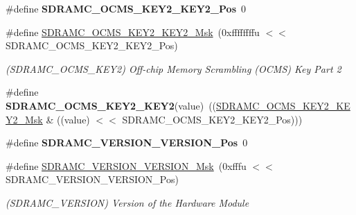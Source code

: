 \begin{DoxyCompactItemize}
\item 
\mbox{\label{group__SAMV71__SDRAMC_ga7a2a31e2cacb71d4e7ef8788168221b0}} 
\#define {\bfseries S\+D\+R\+A\+M\+C\+\_\+\+O\+C\+M\+S\+\_\+\+K\+E\+Y2\+\_\+\+K\+E\+Y2\+\_\+\+Pos}~0
\item 
\mbox{\label{group__SAMV71__SDRAMC_gadf72e098f3b0fbc622694203aae6fa80}} 
\#define \mbox{\hyperlink{group__SAMV71__SDRAMC_gadf72e098f3b0fbc622694203aae6fa80}{S\+D\+R\+A\+M\+C\+\_\+\+O\+C\+M\+S\+\_\+\+K\+E\+Y2\+\_\+\+K\+E\+Y2\+\_\+\+Msk}}~(0xffffffffu $<$$<$ S\+D\+R\+A\+M\+C\+\_\+\+O\+C\+M\+S\+\_\+\+K\+E\+Y2\+\_\+\+K\+E\+Y2\+\_\+\+Pos)
\begin{DoxyCompactList}\small\item\em (S\+D\+R\+A\+M\+C\+\_\+\+O\+C\+M\+S\+\_\+\+K\+E\+Y2) Off-\/chip Memory Scrambling (O\+C\+MS) Key Part 2 \end{DoxyCompactList}\item 
\mbox{\label{group__SAMV71__SDRAMC_gaca7b60dd7970cf6a278623e5d9f74205}} 
\#define {\bfseries S\+D\+R\+A\+M\+C\+\_\+\+O\+C\+M\+S\+\_\+\+K\+E\+Y2\+\_\+\+K\+E\+Y2}(value)~((\mbox{\hyperlink{group__SAMV71__SDRAMC_gadf72e098f3b0fbc622694203aae6fa80}{S\+D\+R\+A\+M\+C\+\_\+\+O\+C\+M\+S\+\_\+\+K\+E\+Y2\+\_\+\+K\+E\+Y2\+\_\+\+Msk}} \& ((value) $<$$<$ S\+D\+R\+A\+M\+C\+\_\+\+O\+C\+M\+S\+\_\+\+K\+E\+Y2\+\_\+\+K\+E\+Y2\+\_\+\+Pos)))
\item 
\mbox{\label{group__SAMV71__SDRAMC_ga0c66833011c818f47a151c6ecbc58bbf}} 
\#define {\bfseries S\+D\+R\+A\+M\+C\+\_\+\+V\+E\+R\+S\+I\+O\+N\+\_\+\+V\+E\+R\+S\+I\+O\+N\+\_\+\+Pos}~0
\item 
\mbox{\label{group__SAMV71__SDRAMC_gab8519592e4fb5379969def2c7c065ae6}} 
\#define \mbox{\hyperlink{group__SAMV71__SDRAMC_gab8519592e4fb5379969def2c7c065ae6}{S\+D\+R\+A\+M\+C\+\_\+\+V\+E\+R\+S\+I\+O\+N\+\_\+\+V\+E\+R\+S\+I\+O\+N\+\_\+\+Msk}}~(0xfffu $<$$<$ S\+D\+R\+A\+M\+C\+\_\+\+V\+E\+R\+S\+I\+O\+N\+\_\+\+V\+E\+R\+S\+I\+O\+N\+\_\+\+Pos)
\begin{DoxyCompactList}\small\item\em (S\+D\+R\+A\+M\+C\+\_\+\+V\+E\+R\+S\+I\+ON) Version of the Hardware Module \end{DoxyCompactList}\item 
$$
\end{DoxyCompactItemize}
